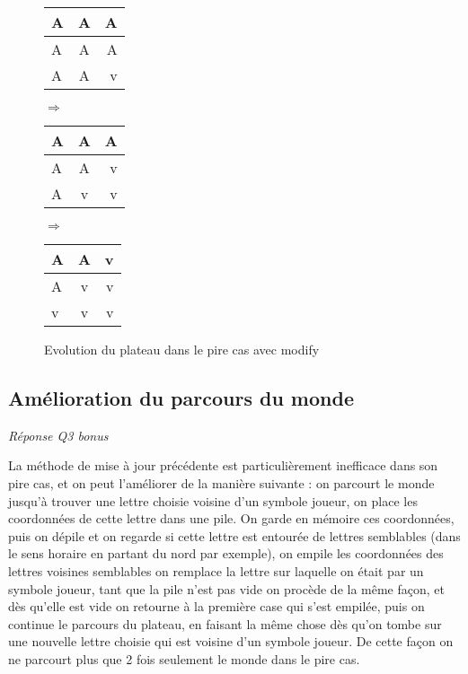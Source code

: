 \documentclass[a4paper,11pt]{article}
\begin{document}
\begin{figure}[!h]
\begin{center}
\begin{tabular}{ | l | c | r | }
	\hline
	A & A & A \\ 
	\hline
	A & A & A \\ 
	\hline
	A & A & \cellcolor{blue!25}v \\
	\hline
\end{tabular}
\hspace{1cm}
{\Huge
\begin{math}
\Rightarrow
\end{math}}
\hspace{1cm}
\begin{tabular}{ | l | c | r | }
	\hline
	A & A & A \\ 
	\hline
	A & A & \cellcolor{blue!25}v \\ 
	\hline
	A & \cellcolor{blue!25}v & \cellcolor{blue!25}v \\
	\hline
\end{tabular}
\hspace{1cm}
{\Huge
\begin{math}
\Rightarrow
\end{math}}
\hspace{1cm}
\begin{tabular}{ | l | c | r | }
	\hline
	A & A & \cellcolor{blue!25}v \\ 
	
	\hline
	A & \cellcolor{blue!25}v & \cellcolor{blue!25}v \\ 
	
	\hline
	
	\cellcolor{blue!25}v & \cellcolor{blue!25}v & \cellcolor{blue!25}v \\
	\hline
\end{tabular}
\end{center}
\caption{Evolution du plateau dans le pire cas avec modify}
\end{figure}

\subsection{Amélioration du parcours du monde}
\emph{Réponse Q3 bonus}

La méthode de mise à jour précédente est particulièrement inefficace dans son
pire cas, et on peut l'améliorer de la manière suivante : on parcourt le monde
jusqu'à trouver une lettre choisie voisine d'un symbole joueur, on place les coordonnées de
cette lettre dans une pile. On garde en mémoire ces coordonnées, puis on dépile et
on regarde si cette lettre est entourée de lettres semblables (dans le sens horaire 
en partant du nord par exemple), on empile les coordonnées des lettres voisines semblables
on remplace la lettre sur laquelle on était par un symbole joueur,
tant que la pile n'est pas vide on procède de la même façon, et dès qu'elle est vide
on retourne à la première case qui s'est empilée, puis on continue le parcours 
du plateau, en faisant la même chose dès qu'on tombe sur une nouvelle lettre choisie
qui est voisine d'un symbole joueur. De cette façon on ne parcourt plus que 2 fois
seulement le monde dans le pire cas.
\end{document}
